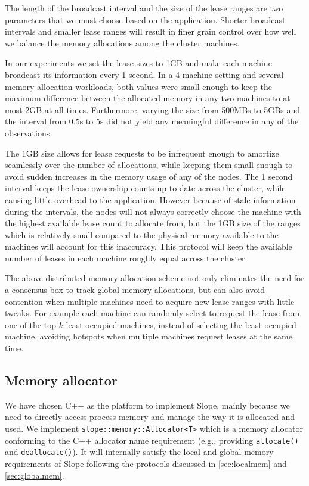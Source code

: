 The length of the broadcast interval and the size of the lease ranges are two
parameters that we must choose based on the application. Shorter broadcast
intervals and smaller lease ranges will result in finer grain control over
how well we balance the memory allocations among the cluster machines.

In our experiments we set the lease sizes to 1GB and
make each machine broadcast its information every 1 second. In a 4 machine
setting and several memory allocation workloads, both values were small enough
to keep the maximum difference between the
allocated memory in any two machines to at most 2GB at all times.
Furthermore, varying the size from
500MBs to 5GBs and the interval from 0.5s to 5s did not yield any meaningful
difference in any of the observations.


The 1GB size allows for lease requests to be infrequent enough to amortize
seamlessly over the number of allocations, while keeping them small enough
to avoid sudden increases in the memory usage of any of the nodes. The 1
second interval keeps the lease ownership counts up to date across the cluster,
while causing little overhead to the application. However because of stale
information during the intervals, the nodes will not always
correctly choose the machine with the highest available lease count to allocate
from, but the 1GB size of the ranges which is relatively small compared to the
physical memory available to the machines will account for this inaccuracy.
This protocol
will keep the available number of leases in each machine roughly equal across
the cluster.

The above distributed memory allocation scheme not only eliminates the need for
a consensus box to track global memory allocations, but can also avoid
contention when multiple machines need to acquire new lease ranges with
little tweaks. For example each machine can randomly select to request the
lease from one of the top $k$ least occupied machines, instead of selecting
the least occupied machine, avoiding hotspots when multiple machines request
leases at the same time.

\subsection{Memory allocator}
\label{sec:platform}
We have chosen C++ as the platform to implement Slope, mainly because we need
to directly access process memory and manage the way it is allocated and used.
We implement \texttt{slope::memory::Allocator<T>} which is a memory allocator
conforming to the C++ allocator name requirement (e.g., providing
\texttt{allocate()} and \texttt{deallocate()}). It will internally satisfy the
local and global memory requirements of Slope following the protocols discussed
in \autoref{sec:localmem} and \autoref{sec:globalmem}.

